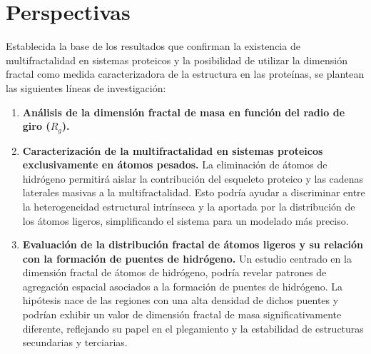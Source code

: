 \chapter*{Perspectivas}

Establecida la base de los resultados que confirman la existencia de multifractalidad en sistemas proteicos y la posibilidad de utilizar la dimensión fractal como medida caracterizadora de la estructura en las prote\'{i}nas, se plantean las siguientes líneas de investigación:

\begin{enumerate}
	\item \textbf{Análisis de la dimensión fractal de masa en función del radio de giro ($R_g$).} 
	\item \textbf{Caracterización de la multifractalidad en sistemas proteicos exclusivamente en átomos pesados.} La eliminación de átomos de hidrógeno permitirá aislar la contribución del esqueleto proteico y las cadenas laterales masivas a la multifractalidad. Esto podría ayudar a discriminar entre la heterogeneidad estructural intrínseca y la aportada por la distribución de los átomos ligeros, simplificando el sistema para un modelado más preciso.

	\item \textbf{Evaluación de la distribución fractal de átomos ligeros y su relación con la formación de puentes de hidrógeno.} Un estudio centrado en la dimensión fractal de átomos de hidrógeno, podría revelar patrones de agregación espacial asociados a la formación de puentes de hidrógeno. La hipótesis nace de las regiones con una alta densidad de dichos puentes y podrían exhibir un valor de dimensión fractal de masa significativamente diferente, reflejando su papel en el plegamiento y la estabilidad de estructuras secundarias y terciarias.
\end{enumerate}







